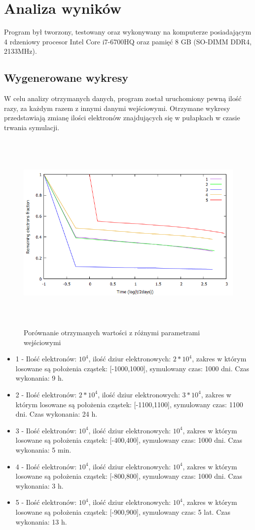\chapter{Analiza wyników}
Program był tworzony, testowany oraz wykonywany na komputerze posiadającym 4 rdzeniowy procesor Intel Core i7-6700HQ oraz pamięć 8 GB (SO-DIMM DDR4, 2133MHz).

\section{Wygenerowane wykresy}
\label{wynik:wykres}
W celu analizy otrzymanych danych, program został uruchomiony pewną ilość razy, za każdym razem z innymi danymi wejściowymi. Otrzymane wykresy przedstawiają zmianę ilości elektronów znajdujących się w pułapkach w czasie trwania symulacji.

\begin{figure}[H]
\centering
\includegraphics[width=17cm, height = 10cm]{wykres_all}
\caption{Porównanie otrzymanych wartości z różnymi parametrami wejściowymi}
\label{rys:1}
\end{figure}
\newpage
\begin{itemize}
\item 1 - Ilość elektronów: $10^{4}$, ilość dziur elektronowych: $2*10^{4}$, zakres w którym losowane są położenia cząstek: [-1000,1000], symulowany czas: 1000 dni. Czas wykonania: 9 h.
\item 2 - Ilość elektronów: $2*10^{4}$, ilość dziur elektronowych: $3*10^{4}$, zakres w którym losowane są położenia cząstek: [-1100,1100], symulowany czas: 1100 dni. Czas wykonania: 24 h.
\item 3 - Ilość elektronów: $10^{4}$, ilość dziur elektronowych: $10^{4}$, zakres w którym losowane są położenia cząstek: [-400,400], symulowany czas: 1000 dni. Czas wykonania: 5 min.
\label{wykres:1}
\item 4 - Ilość elektronów: $10^{4}$, ilość dziur elektronowych: $10^{4}$, zakres w którym losowane są położenia cząstek: [-800,800], symulowany czas: 1000 dni. Czas wykonania: 3 h.
\label{wykres:2}
\item 5 - Ilość elektronów: $10^{4}$, ilość dziur elektronowych: $10^{4}$, zakres w którym losowane są położenia cząstek: [-900,900], symulowany czas: 5 lat. Czas wykonania: 13 h.
\end{itemize}


